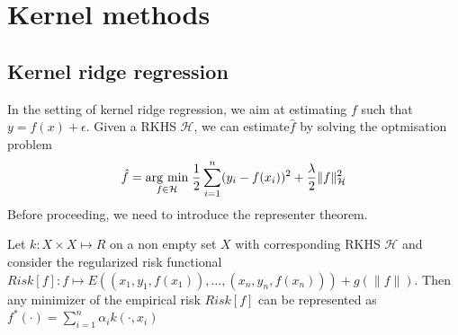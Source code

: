 
\section{Kernel methods}
\subsection{Kernel ridge regression}
In the setting of kernel ridge regression, we aim at estimating $f$ such that $y=f(x)+\epsilon$. Given a RKHS $\mathcal{H}$, we can estimate$\hat{f}$ by solving the optmisation problem
\begin{equation}\label{eq:kernel ridge}
    \hat{f}=\underset{f\in \mathcal{H}}{\operatorname{arg}\,\operatorname{min}}\;\frac{1}{2}\sum\limits_{i=1}^n(y_i-f(x_i))^2+\frac{\lambda}{2}\|f\|_{\mathcal{H}}^2
\end{equation}
Before proceeding, we need to introduce the representer theorem.
\begin{theorem}
    Let $k:X \times X \mapsto R$ on a non empty set $X$ with corresponding RKHS $\mathcal{H}$ and consider the regularized risk functional $Risk[f]:f \mapsto  E\left((x_{1},y_{1},f(x_{1})),\ldots ,(x_{n},y_{n},f(x_{n}))\right)+g\left(\| f\| \right)$. Then any minimizer of the empirical risk $Risk[f]$ can be represented as $ f^{*}(\cdot )=\sum _{i=1}^{n}\alpha _{i}k(\cdot ,x_{i})$
\end{theorem}

